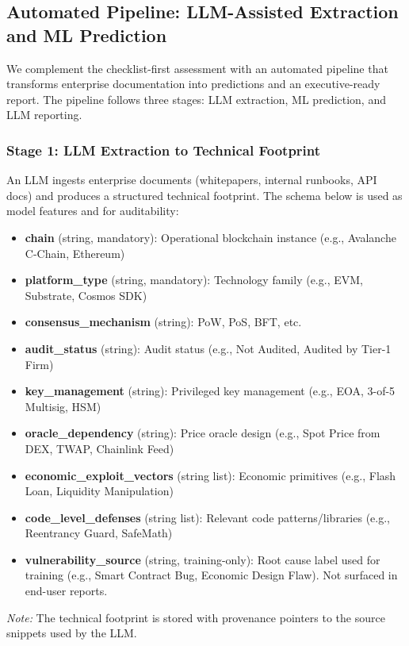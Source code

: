 \subsection{Automated Pipeline: LLM-Assisted Extraction and ML Prediction}
\label{sec:ml_pipeline}

We complement the checklist-first assessment with an automated pipeline that transforms enterprise documentation into predictions and an executive-ready report. The pipeline follows three stages: LLM extraction, ML prediction, and LLM reporting.

\subsubsection{Stage 1: LLM Extraction to Technical Footprint}
An LLM ingests enterprise documents (whitepapers, internal runbooks, API docs) and produces a structured technical footprint. The schema below is used as model features and for auditability:
\begin{itemize}
    \item \textbf{chain} (string, mandatory): Operational blockchain instance (e.g., Avalanche C-Chain, Ethereum)
    \item \textbf{platform\_type} (string, mandatory): Technology family (e.g., EVM, Substrate, Cosmos SDK)
    \item \textbf{consensus\_mechanism} (string): PoW, PoS, BFT, etc.
    \item \textbf{audit\_status} (string): Audit status (e.g., Not Audited, Audited by Tier-1 Firm)
    \item \textbf{key\_management} (string): Privileged key management (e.g., EOA, 3-of-5 Multisig, HSM)
    \item \textbf{oracle\_dependency} (string): Price oracle design (e.g., Spot Price from DEX, TWAP, Chainlink Feed)
    \item \textbf{economic\_exploit\_vectors} (string list): Economic primitives (e.g., Flash Loan, Liquidity Manipulation)
    \item \textbf{code\_level\_defenses} (string list): Relevant code patterns/libraries (e.g., Reentrancy Guard, SafeMath)
    \item \textbf{vulnerability\_source} (string, training-only): Root cause label used for training (e.g., Smart Contract Bug, Economic Design Flaw). Not surfaced in end-user reports.
\end{itemize}

\textit{Note:} The technical footprint is stored with provenance pointers to the source snippets used by the LLM.

